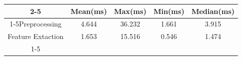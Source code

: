 \documentclass{standalone}
\begin{document}
 
 \begin{tabular}{|c |c |c |c |c |}
\cline{2-5}\cline{2-5} \multicolumn{1}{c |}{ } & Mean(ms) & Max(ms) & Min(ms) & Median(ms)\\ 
\cline{1-5}Preprocessing & 4.644 & 36.232 & 1.661 & 3.915\\ 
 \hhline{|=|=|=|=|=|}Feature Extaction & 1.653 & 15.516 & 0.546 & 1.474\\ 
 \cline{1-5}\hline \end{tabular}
 
\end{document}
